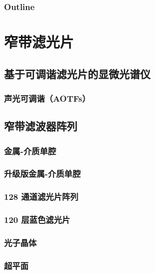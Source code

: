 \documentclass[9 pt,makeindex]{beamer}
\begin{document}
\frame{\titlepage}

\begin{frame}
    \frametitle{Outline}

    \tableofcontents
\end{frame}

\section{窄带滤光片}

\subsection{基于可调谐滤光片的显微光谱仪}
\subsubsection{声光可调谐（AOTFs）}


\subsection{窄带滤波器阵列}
\subsubsection{金属-介质单腔}

\subsubsection{升级版金属-介质单腔}

\subsubsection{128 通道滤光片阵列}

\subsubsection{120 层蓝色滤光片}

\subsubsection{光子晶体}

\subsubsection{超平面}

\end{document}
